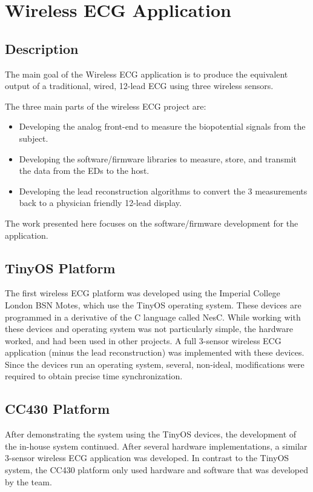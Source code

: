 \documentclass{article}
\begin{document}
\section{Wireless ECG Application}\label{section:wirelessecg}
\subsection{Description}
The main goal of the Wireless ECG application is to produce the equivalent output of a traditional, wired, 12-lead ECG using three wireless sensors. 

The three main parts of the wireless ECG project are: 
\begin{itemize}
\item Developing the analog front-end to measure the biopotential signals from the subject.
\item Developing the software/firmware libraries to measure, store, and transmit the data from the EDs to the host.
\item Developing the lead reconstruction algorithms to convert the 3 measurements back to a physician friendly 12-lead display.
\end{itemize}
The work presented here focuses on the software/firmware development for the application.

\subsection{TinyOS Platform}
The first wireless ECG platform was developed using the Imperial College London BSN Motes, which use the TinyOS operating system. These devices are programmed in a derivative of the C language called NesC. While working with these devices and operating system was not particularly simple, the hardware worked, and had been used in other projects. A full 3-sensor wireless ECG application (minus the lead reconstruction) was implemented with these devices. Since the devices run an operating system, several, non-ideal, modifications were required to obtain precise time synchronization.

\subsection{CC430 Platform}
After demonstrating the system using the TinyOS devices, the development of the in-house system continued. After several hardware implementations, a similar 3-sensor wireless ECG application was developed. In contrast to the TinyOS system, the CC430 platform only used hardware and software that was developed by the team.
\end{document}
